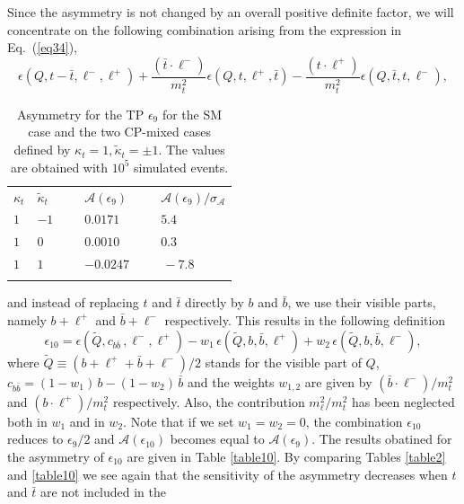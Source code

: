 \documentclass[aps,preprint,tightenlines,floatfix,superscriptaddress,nofootinbib,showpacs]{revtex4-1}
\def\beq{\begin{equation}}
\def\eeq{\end{equation}}
\def\tbar{\bar{t}}
\def\bbar{\bar{b}}
\def\kp{\kappa_t}
\def\kpt{\tilde{\kappa}_t}
\begin{document}
%
Since the asymmetry is not changed by an overall positive definite
factor, we will concentrate on the following combination arising from
the expression in Eq.~(\ref{eq34}),
%
\beq
\label{eq35}
\epsilon(Q,t-\tbar,\ell^-,\ell^+)+\frac{(\tbar\cdot \ell^-)}{m^2_t}\epsilon(Q,t,\ell^+,\tbar)-\frac{(t\cdot\ell^+)}{m^2_t}\epsilon(Q,\tbar,t,\ell^-),
\eeq
%
\begin{table}[H]
\caption{Asymmetry for the TP $\epsilon_{9}$ for the SM case and the
  two $\mathrm{CP}$-mixed cases defined by $\kp=1,\kpt=\pm 1$. The
  values are obtained with $10^5$ simulated events.}
\label{table9}
\begin{center}
\begin{tabular}{|C{1cm}|C{1cm}||C{2cm}|C{2cm}|}
\hhline{|====|}
$\kappa_t$&$\tilde{\kappa}_t$~~&$\mathcal{A}(\epsilon_9)$~~&$\mathcal{A}(\epsilon_9)/\sigma_{\mathcal{A}}$ \\ 
\hhline{|====|} 
$1$ & $-1$~~~ & $0.0171$~ & $5.4$~ \\[0.6mm]
\hline
$1$ & $0$ & $0.0010$~ & $0.3$~ \\[0.6mm]
\hline
$1$ & $1$ & $-0.0247$~~~ & $\,-7.8$~~~~ \\[0.6mm]
\hhline{|====|}
\end{tabular}
\end{center} 
\end{table}
\noindent
%
and instead of replacing $t$ and $\tbar$ directly by $b$ and $\bbar$,
we use their visible parts, namely $b+\ell^+$ and $\bbar +\ell^-$
respectively. This results in the following definition
%
\beq
\label{eq36}
\epsilon_{10}=\epsilon(\tilde{Q},c_{b\bbar}\,,\ell^-,\ell^+)-w_1\,\epsilon(\tilde{Q},b,\bbar,\ell^+)+w_2\,\epsilon(\tilde{Q},b,\bbar,\ell^-),
\eeq
%
where $\tilde{Q}\equiv (b+\ell^+\!+\bbar +\ell^-)/2$ stands for the
visible part of $Q$, $c_{b\bbar}=(1-w_1)\,b-(1-w_2)\,\bbar$ and the
weights $w_{1,2}$ are given by $(\bbar\cdot \ell^-)/m^2_t $ and
$(b\cdot \ell^+)/m^2_t$ respectively. Also, the contribution
$m^2_{\ell}/m^2_t$ has been neglected both in $w_1$ and in $w_2$. Note
that if we set $w_1=w_2=0$, the combination $\epsilon_{10}$ reduces to
$\epsilon_9 /2$ and $\mathcal{A}(\epsilon_{10})$ becomes equal to
$\mathcal{A}(\epsilon_9)$. The results obatined for the asymmetry of
$\epsilon_{10}$ are given in Table \ref{table10}. By comparing Tables
\ref{table2} and \ref{table10} we see again that the sensitivity of
the asymmetry decreases when $t$ and $\tbar$ are not included in the
\end{document}
